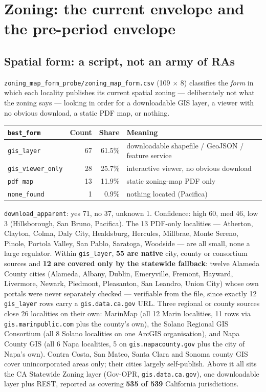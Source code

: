 \documentclass[11pt]{article}
\begin{document}
\section{Zoning: the current envelope and the pre-period envelope}

\subsection{Spatial form: a script, not an army of RAs}

\texttt{zoning\_map\_form\_probe/zoning\_map\_form.csv} (109 $\times$ 8) classifies the
\emph{form} in which each locality publishes its current spatial zoning --- deliberately not what
the zoning says --- looking in order for a downloadable GIS layer, a viewer with no obvious
download, a static PDF map, or nothing.

\begin{center}
\begin{tabular}{lrrl}
\toprule
\textbf{\texttt{best\_form}} & \textbf{Count} & \textbf{Share} & \textbf{Meaning} \\
\midrule
\texttt{gis\_layer}        & 67 & 61.5\% & downloadable shapefile / GeoJSON / feature service \\
\texttt{gis\_viewer\_only} & 28 & 25.7\% & interactive viewer, no obvious download \\
\texttt{pdf\_map}          & 13 & 11.9\% & static zoning-map PDF only \\
\texttt{none\_found}       & 1  & 0.9\%  & nothing located (Pacifica) \\
\bottomrule
\end{tabular}
\end{center}

\texttt{download\_apparent}: yes 71, no 37, unknown 1. Confidence: high 60, med 46, low 3
(Hillsborough, San Bruno, Pacifica). The 13 PDF-only localities --- Atherton, Clayton, Colma,
Daly City, Healdsburg, Hercules, Millbrae, Monte Sereno, Pinole, Portola Valley, San Pablo,
Saratoga, Woodside --- are all small, none a large regulator. Within \texttt{gis\_layer},
\textbf{55 are native} city, county or consortium sources and \textbf{12 are covered only by the
statewide fallback}: twelve Alameda County cities (Alameda, Albany, Dublin, Emeryville, Fremont,
Hayward, Livermore, Newark, Piedmont, Pleasanton, San Leandro, Union City) whose own portals were
never separately checked --- verifiable from the file, since exactly 12 \texttt{gis\_layer} rows
carry a \texttt{gis.data.ca.gov} URL. Three regional or county sources close 26 localities on
their own: MarinMap (all 12 Marin localities, 11 rows via \texttt{gis.marinpublic.com} plus the
county's own), the Solano Regional GIS Consortium (all 8 Solano localities on one ArcGIS
organisation), and Napa County GIS (all 6 Napa localities, 5 on \texttt{gis.napacounty.gov} plus
the city of Napa's own). Contra Costa, San Mateo, Santa Clara and Sonoma county GIS cover
unincorporated areas only; their cities largely self-publish. Above it all sits the CA Statewide
Zoning layer (Gov-OPR, \texttt{gis.data.ca.gov}), one downloadable layer plus REST, reported as
covering \textbf{535 of 539} California jurisdictions.
\end{document}
